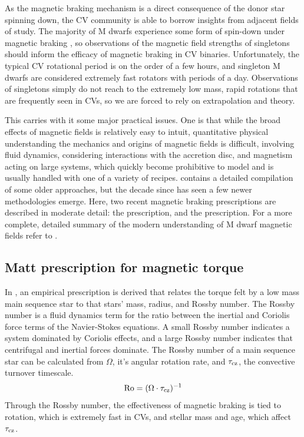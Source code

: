 As the magnetic braking mechanism is a direct consequence of the donor star spinning down, the CV community is able to borrow insights from adjacent fields of study. The majority of M dwarfs experience some form of spin-down under magnetic braking , so observations of the magnetic field strengths of singletons should inform the efficacy of magnetic braking in CV binaries. Unfortunately, the typical CV rotational period is on the order of a few hours, and singleton M dwarfs are considered extremely fast rotators with periods of a day. Observations of singletons simply do not reach to the extremely low mass, rapid rotations that are frequently seen in CVs, so we are forced to rely on extrapolation and theory.

This carries with it some major practical issues. One is that while the broad effects of magnetic fields is relatively easy to intuit, quantitative physical understanding the mechanics and origins of magnetic fields is difficult, involving fluid dynamics, considering interactions with the accretion disc, and magnetism acting on large systems, which quickly become prohibitive to model and is usually handled with one of a variety of recipes. \citealt{knigge11} contains a detailed compilation of some older approaches, but the decade since has seen a few newer methodologies emerge. Here, two recent magnetic braking prescriptions are described in moderate detail: the \citet{matt2015} prescription, and the \citet{garraffo2018a} prescription. For a more complete, detailed summary of the modern understanding of M dwarf magnetic fields refer to \citet{kochukhov2021}. 


\subsection{Matt prescription for magnetic torque}
\label{sect:introduction:matt braking}

In \citet{matt2015}, an empirical prescription is derived that relates the torque felt by a low mass main sequence star to that stars' mass, radius, and Rossby number. The Rossby number is a fluid dynamics term for the ratio between the inertial and Coriolis force terms of the Navier-Stokes equations. A small Rossby number indicates a system dominated by Coriolis effects, and a large Rossby number indicates that centrifugal and inertial forces dominate. The Rossby number of a main sequence star can be calculated from $\Omega$, it's angular rotation rate, and $\tau_{\rm cz}$, the convective turnover timescale.
\begin{equation}
    \label{eqn:introduction:rossby number}
    {\rm Ro} = (\Omega \cdot \tau_{\rm cz})^{-1}
\end{equation}
Through the Rossby number, the effectiveness of magnetic braking is tied to rotation, which is extremely fast in CVs, and stellar mass and age, which affect $\tau_{\rm cz}$.

